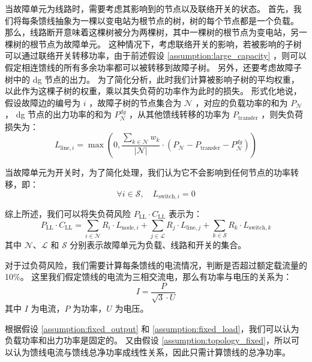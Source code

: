 \documentclass{article}
\begin{document}
当故障单元为线路时，需要考虑其影响到的节点以及联络开关的状态。
首先，我们将每条馈线抽象为一棵以变电站为根节点的树，树的每个节点都是一个负载。
那么，线路断开意味着这棵树被分为两棵树，其中一棵树的根节点为变电站，另一棵树的根节点为故障单元。
这种情况下，考虑联络开关的影响，若被影响的子树可以通过联络开关转移功率，由于前述假设 \ref{assumption:large_capacity} ，则可以假定相连馈线的所有多余功率都可以被转移到故障子树。
另外，还要考虑故障子树中的 dg 节点的出力。
为了简化分析，此时我们计算被影响子树的平均权重，以此作为这棵子树的权重，乘以其失负荷的功率作为此时的损失。
形式化地说，假设故障边的编号为 $i$ ，故障子树的节点集合为 $\mathcal{N}$ ，对应的负载功率的和为 $P_{\mathcal{N}}$ ，
dg 节点的出力功率的和为 $P_{\mathcal{N}}^{dg}$ ，从其他馈线转移的功率为 $P_{\text{transfer}}$ ，则失负荷损失为：
\begin{equation}\label{eq:loss_line}
  L_{\text{line},i} = \max\left(
    0,
    \frac{\sum_{k\in\mathcal{N}}w_k}{|\mathcal{N}|} \cdot
    (P_{\mathcal{N}} - P_{\text{transfer}} - P_{\mathcal{N}}^{dg})
  \right)
\end{equation}

当故障单元为开关时，为了简化处理，我们认为它不会影响到任何节点的功率转移，即：
\begin{equation}\label{eq:loss_switch}
  \forall i \in \mathcal{S},\quad L_{\text{switch},i} = 0
\end{equation}

综上所述，我们可以将失负荷风险 $P_{\text{LL}} \cdot C_{\text{LL}} $ 表示为：
\begin{equation}\label{eq:loss_total}
  P_{\text{LL}} \cdot C_{\text{LL}}
  = \sum_{i\in\mathcal{N}} R_{i} \cdot L_{\text{node},i}
  + \sum_{j\in\mathcal{L}} R_{j} \cdot L_{\text{line},j}
  + \sum_{k\in\mathcal{S}} R_{k} \cdot L_{\text{switch},k}
\end{equation}
其中 $\mathcal{N}$、$\mathcal{L}$ 和 $\mathcal{S}$ 分别表示故障单元为负载、线路和开关的集合。

对于过负荷风险，我们需要计算每条馈线的电流情况，判断是否超过额定载流量的 10\%。
这里我们假定馈线的电流为三相交流电，那么有功率与电压的关系为：
\begin{equation}\label{eq:current_formula}
  I = \frac{P}{\sqrt{3} \cdot U}
\end{equation}
其中 $I$ 为电流，$P$ 为功率，$U$ 为电压。

根据假设 \ref{assumption:fixed_output} 和 \ref{assumption:fixed_load}，我们可以认为负载功率和出力功率是固定的。
又由假设 \ref{assumption:topology_fixed}，所以可以认为馈线电流与馈线总净功率成线性关系，因此只需计算馈线的总净功率。
\end{document}
